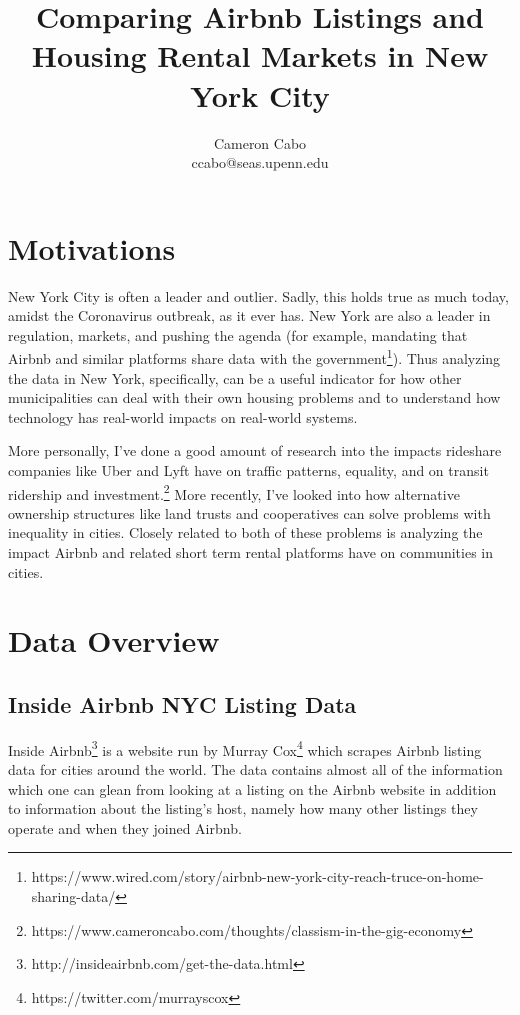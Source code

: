 \documentclass[12pt]{article}
\begin{document}
 
\title{Comparing Airbnb Listings and Housing Rental Markets in New York City}
\author{Cameron Cabo\\
ccabo@seas.upenn.edu}

\maketitle
\section{Motivations}

New York City is often a leader and outlier. Sadly, this holds true as much today, amidst the Coronavirus outbreak, as it ever has. New York are also a leader in regulation, markets, and pushing the agenda (for example, mandating that Airbnb and similar platforms share data with the government\footnote{https://www.wired.com/story/airbnb-new-york-city-reach-truce-on-home-sharing-data/}). Thus analyzing the data in New York, specifically, can be a useful indicator for how other municipalities can deal with their own housing problems and to understand how technology has real-world impacts on real-world systems.

More personally, I've done a good amount of research into the impacts rideshare companies like Uber and Lyft have on traffic patterns, equality, and on transit ridership and investment.\footnote{https://www.cameroncabo.com/thoughts/classism-in-the-gig-economy} More recently, I've looked into how alternative ownership structures like land trusts and cooperatives can solve problems with inequality in cities. Closely related to both of these problems is analyzing the impact Airbnb and related short term rental platforms have on communities in cities.

\section{Data Overview}

\subsection{Inside Airbnb NYC Listing Data}

Inside Airbnb\footnote{http://insideairbnb.com/get-the-data.html} is a website run by Murray Cox\footnote{https://twitter.com/murrayscox} which scrapes Airbnb listing data for cities around the world. The data contains almost all of the information which one can glean from looking at a listing on the Airbnb website in addition to information about the listing's host, namely how many other listings they operate and when they joined Airbnb.
\end{document}
